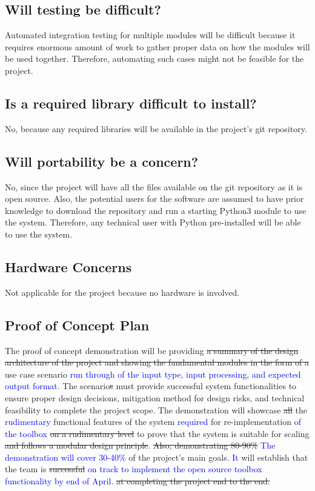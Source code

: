\documentclass{article}
\begin{document}
\subsection{Will testing be difficult?}
Automated integration testing for multiple modules will be difficult because it requires enormous amount of work to gather proper data on how the modules will be used together. Therefore, automating such cases might not be feasible for the project.

\subsection{Is a required library difficult to install?}
No, because any required libraries will be available in the project's git repository.

\subsection{Will portability be a concern?}
No, since the project will have all the files available on the git repository as it is open source. Also, the potential users for the software are assumed to have prior knowledge to download the repository and run a starting Python3 module to use the system. Therefore, any technical user with Python pre-installed will be able to use the system.

\subsection{Hardware Concerns}
Not applicable for the project because no hardware is involved. 

\subsection{Proof of Concept Plan}
The proof of concept demonstration will be providing \sout{a summary of the design architecture of the project and showing the fundamental modules in the form of a} use case scenario \textcolor{blue}{run through of the input type, input processing, and expected output format}. The scenario\sout{s} must provide successful system functionalities to ensure proper design decisions, mitigation method for design risks, and technical feasibility to complete the project scope. The demonstration will showcase \sout{all} the \textcolor{blue}{rudimentary} functional features of the system \textcolor{blue}{required} for re-implementation \textcolor{blue}{of the toolbox} \sout{on a rudimentary level} to prove that the system is suitable for scaling \sout{and follows a modular design principle}. \sout{Also, demonstrating 80-90\%} \textcolor{blue}{The demonstration will cover 30-40\%} of the project's main goals. \textcolor{blue}{It} will establish that the team is \sout{successful} \textcolor{blue}{on track to implement the open source toolbox functionality by end of April.} \sout{at completing the project end to the end.}
\end{document}
